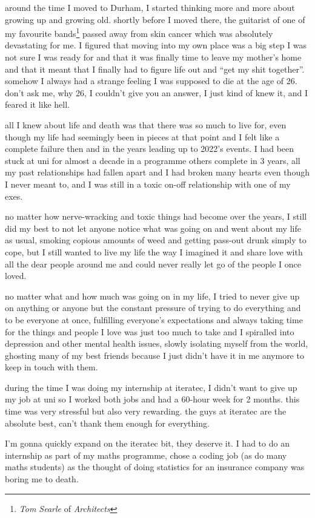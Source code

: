 \documentclass[12pt]{report}
\theoremstyle{definition}
\theoremstyle{remark}
\begin{document}
around the time I moved to Durham, I started thinking more and more about growing up and growing old. shortly before I moved there, the guitarist of one of my favourite bands\footnote{\emph{Tom Searle} of \emph{Architects}} passed away from skin cancer which was absolutely devastating for me. I figured that moving into my own place was a big step I was not sure I was ready for and that it was finally time to leave my mother's home and that it meant that I finally had to figure life out and ``get my shit together''. somehow I always had a strange feeling I was supposed to die at the age of 26. don't ask me, why 26, I couldn't give you an answer, I just kind of knew it, and I feared it like hell.

all I knew about life and death was that there was so much to live for, even though my life had seemingly been in pieces at that point and I felt like a complete failure then and in the years leading up to 2022's events. I had been stuck at uni for almost a decade in a programme others complete in 3 years, all my past relationships had fallen apart and I had broken many hearts even though I never meant to, and I was still in a toxic on-off relationship with one of my exes.

no matter how nerve-wracking and toxic things had become over the years, I still did my best to not let anyone notice what was going on and went about my life as usual, smoking copious amounts of weed and getting pass-out drunk simply to cope, but I still wanted to live my life the way I imagined it and share love with all the dear people around me and could never really let go of the people I once loved.

no matter what and how much was going on in my life, I tried to never give up on anything or anyone but the constant pressure of trying to do everything and to be everyone at once, fulfilling everyone's expectations and always taking time for the things and people I love was just too much to take and I spiralled into depression and other mental health issues, slowly isolating myself from the world, ghosting many of my best friends because I just didn't have it in me anymore to keep in touch with them.

during the time I was doing my internship at iteratec, I didn't want to give up my job at uni so I worked both jobs and had a 60-hour week for 2 months. this time was very stressful but also very rewarding. the guys at iteratec are the absolute best, can't thank them enough for everything.

I'm gonna quickly expand on the iteratec bit, they deserve it. I had to do an internship as part of my maths programme, chose a coding job (as do many maths students) as the thought of doing statistics for an insurance company was boring me to death.
\end{document}
